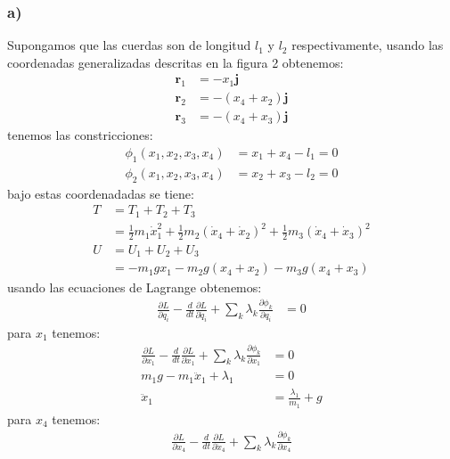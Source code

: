 \documentclass{article}
\begin{document}
\begin{tcolorbox}[breakable]
    \subsubsection*{a)}
    Supongamos que las cuerdas son de longitud $l_1$ y $l_2$ respectivamente, usando las coordenadas generalizadas
    descritas en la figura 2 obtenemos:
    \begin{align*}
        \bm{r}_1 &= -x_1 \bm{j} \\
        \bm{r}_2 &= -(x_4+x_2) \bm{j} \\
        \bm{r}_3 &= -(x_4+x_3) \bm{j}
    \end{align*}
    tenemos las constricciones:
    \begin{align*}
        \phi_1(x_1,x_2,x_3,x_4) &= x_1 + x_4 - l_1 = 0 \\
        \phi_2(x_1,x_2,x_3,x_4) &= x_2 + x_3 - l_2 = 0 
    \end{align*}
    bajo estas coordenadadas se tiene:
    \begin{align*}
        T
        &= T_1 + T_2 + T_3 \\
        &=\frac{1}{2}m_1\dot{x}_1^2 
        + \frac{1}{2}m_2(\dot{x}_4 + \dot{x}_2)^2
        + \frac{1}{2}m_3(\dot{x}_4 + \dot{x}_3)^2 \\
        U 
        &= U_1 + U_2 + U_3 \\
        &= -m_1gx_1-m_2g(x_4+x_2)-m_3g(x_4+x_3)
    \end{align*}
    usando las ecuaciones de Lagrange obtenemos:
    \begin{align*}
        \frac{\partial L}{\partial q_i} 
        -\frac{d}{dt}\frac{\partial L}{\partial \dot{q}_i} 
        + \sum_k \lambda_k \frac{\partial \phi_k}{\partial q_i}
        &= 0  
    \end{align*}
    para $x_1$ tenemos:
    \begin{align*}
        \frac{\partial L}{\partial x_1} 
        -\frac{d}{dt}\frac{\partial L}{\partial \dot{x}_1} 
        + \sum_k \lambda_k \frac{\partial \phi_k}{\partial x_1}
        &= 0  \\
        m_1g - m_1\ddot{x}_1 + \lambda_1 &= 0 \\
        \ddot{x}_1 &= \frac{\lambda_1}{m_1} + g
    \end{align*}
    para $x_4$ tenemos:
    \begin{align*}
        \frac{\partial L}{\partial x_4} 
        -\frac{d}{dt}\frac{\partial L}{\partial \dot{x}_4} 
        + \sum_k \lambda_k \frac{\partial \phi_k}{\partial x_4}

\end{align*}
\end{tcolorbox}
\end{document}
